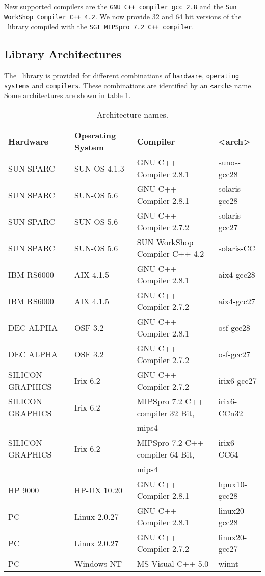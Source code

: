 New supported compilers are the {\tt GNU C++ compiler gcc 2.8} and the
{\tt Sun WorkShop Compiler C++ 4.2}. We now provide 32 and 64 bit versions
of the \ABACUS\ library compiled with the {\tt SGI MIPSpro 7.2 C++ compiler}.

\subsection{Library Architectures}

The \ABACUS\ library is provided for different combinations of {\tt hardware},
{\tt operating systems} and {\tt compilers}.
These combinations are identified by an {\tt <arch>} name.
Some architectures are shown in table \ref{table:arch}.
\begin{table}[htp]
\begin{center}
\begin{tabular}{|l|l|l|l|}
\hline
Hardware & Operating System & Compiler & <arch>\\
\hline
SUN SPARC & SUN-OS 4.1.3 & GNU C++ Compiler 2.8.1 & sunos-gcc28 \\
SUN SPARC & SUN-OS 5.6 & GNU C++ Compiler 2.8.1 & solaris-gcc28 \\
SUN SPARC & SUN-OS 5.6 & GNU C++ Compiler 2.7.2 & solaris-gcc27 \\
SUN SPARC & SUN-OS 5.6 & SUN WorkShop Compiler C++ 4.2 & solaris-CC \\
IBM RS6000 & AIX 4.1.5 & GNU C++ Compiler 2.8.1 & aix4-gcc28 \\
IBM RS6000 & AIX 4.1.5 & GNU C++ Compiler 2.7.2 & aix4-gcc27 \\
DEC ALPHA & OSF 3.2 & GNU C++ Compiler 2.8.1 & osf-gcc28 \\
DEC ALPHA & OSF 3.2 & GNU C++ Compiler 2.7.2 & osf-gcc27 \\
SILICON GRAPHICS & Irix 6.2 & GNU C++ Compiler 2.7.2 & irix6-gcc27 \\
SILICON GRAPHICS & Irix 6.2 & MIPSpro 7.2 C++ compiler 32 Bit,  & irix6-CCn32 \\
& & mips4 & \\
SILICON GRAPHICS & Irix 6.2 & MIPSpro 7.2 C++ compiler 64 Bit, & irix6-CC64 \\
& & mips4 & \\
HP 9000 & HP-UX 10.20 & GNU C++ Compiler 2.8.1 & hpux10-gcc28 \\
PC & Linux 2.0.27 & GNU C++ Compiler 2.8.1 & linux20-gcc28 \\
PC & Linux 2.0.27 & GNU C++ Compiler 2.7.2 & linux20-gcc27 \\
PC & Windows NT & MS Visual C++ 5.0 & winnt \\
\hline
\end{tabular}
\caption{Architecture names.}
\label{table:arch}
\end{center}
\end{table}

